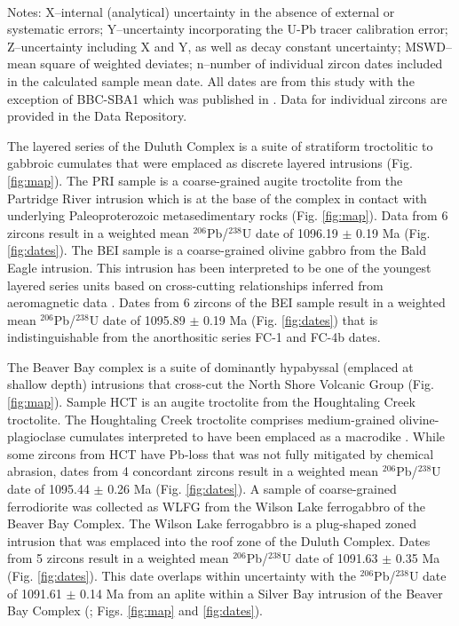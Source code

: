 \documentclass[11pt,letterpaper]{article}
\begin{document}
\begin{table}[h!]
\begin{tabular}{|p{3 cm}|p{2.8 cm}|p{1.6 cm}|c|ccc|c|c|p{1.7 cm}|}
\hline
\end{tabular}\\
Notes: X--internal (analytical) uncertainty in the absence of external or systematic errors; Y--uncertainty incorporating the U-Pb tracer calibration error; Z--uncertainty including X and Y, as well as decay constant uncertainty; MSWD--mean square of weighted deviates; n--number of individual zircon dates included in the calculated sample mean date. All dates are from this study with the exception of BBC-SBA1 which was published in \cite{Fairchild2017a}. Data for individual zircons are provided in the Data Repository.
\label{tab:geochron}
\end{table}

The layered series of the Duluth Complex is a suite of stratiform troctolitic to gabbroic cumulates that were emplaced as discrete layered intrusions (Fig. \ref{fig:map}). The PRI sample is a coarse-grained augite troctolite from the Partridge River intrusion which is at the base of the complex in contact with underlying Paleoproterozoic metasedimentary rocks (Fig. \ref{fig:map}). Data from 6 zircons result in a weighted mean $^{206}$Pb/$^{238}$U date of 1096.19 $\pm$ 0.19 Ma (Fig. \ref{fig:dates}). The BEI sample is a coarse-grained olivine gabbro from the Bald Eagle intrusion. This intrusion has been interpreted to be one of the youngest layered series units based on cross-cutting relationships inferred from aeromagnetic data \citep{Miller2002c}. Dates from 6 zircons of the BEI sample result in a weighted mean $^{206}$Pb/$^{238}$U date of 1095.89 $\pm$ 0.19 Ma (Fig. \ref{fig:dates}) that is indistinguishable from the anorthositic series FC-1 and FC-4b dates. 

The Beaver Bay complex is a suite of dominantly hypabyssal (emplaced at shallow depth) intrusions that cross-cut the North Shore Volcanic Group (Fig. \ref{fig:map}). Sample HCT is an augite troctolite from the Houghtaling Creek troctolite. The Houghtaling Creek troctolite comprises medium-grained olivine-plagioclase cumulates interpreted to have been emplaced as a macrodike \citep{Miller2001a}. While some zircons from HCT have Pb-loss that was not fully mitigated by chemical abrasion, dates from 4 concordant zircons result in a weighted mean $^{206}$Pb/$^{238}$U date of 1095.44 $\pm$ 0.26 Ma (Fig. \ref{fig:dates}). A sample of coarse-grained ferrodiorite was collected as WLFG from the Wilson Lake ferrogabbro of the Beaver Bay Complex. The Wilson Lake ferrogabbro is a plug-shaped zoned intrusion that was emplaced into the roof zone of the Duluth Complex. Dates from 5 zircons result in a weighted mean $^{206}$Pb/$^{238}$U date of 1091.63 $\pm$ 0.35 Ma (Fig. \ref{fig:dates}). This date overlaps within uncertainty with the $^{206}$Pb/$^{238}$U date of 1091.61 $\pm$ 0.14 Ma from an aplite within a Silver Bay intrusion of the Beaver Bay Complex (\citealp{Fairchild2017a}; Figs. \ref{fig:map} and \ref{fig:dates}).
\end{document}
